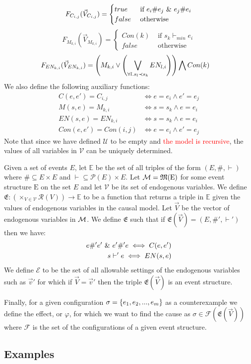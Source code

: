$$
    F_{C_{i,j}}(\vec V_{C_{i,j}}) = \begin{cases}
        true  & \text{ if } e_i \# e_j \ \& \  e_j \# e_i \\
        false & \text{ otherwise }
    \end{cases}
$$
$$
    F_{M_{k,i}}(\vec V_{M_{k,i}}) = \begin{cases}
        Con(k) & \text{ if } s_k \vdash_{min} e_i \\
        false  & \text{ otherwise }
    \end{cases}
$$
\begin{align*}
    F_{EN_{k,i}}(\vec V_{EN_{k,i}}) & =
    \left(
    M_{k,i} \vee
    \left(
    \bigvee_{\forall l. s_l  \prec s_k}EN_{l,i}
    \right)
    \right)
    \bigwedge
    Con(k)
\end{align*}
We also define the following auxiliary functions:
\begin{align*}
    C(e,e') = C_{i,j}    & \iff e = e_i \wedge e' = e_j \\
    M(s,e)  = M_{k,i}    & \iff s = s_k \wedge e = e_i  \\
    EN(s,e)  = EN_{k,i}  & \iff s = s_k \wedge e = e_i  \\
    Con(e,e') = Con(i,j) & \iff e = e_i \wedge e' = e_j
\end{align*}
Note that since we have defined $\mathcal{U}$ to be empty and
\textcolor{red}{the model is recursive}, the values of all variables in
$\mathcal{V}$ can be uniquely determined.

Given a set of events $E$, let $\mathbb{E}$ be the set of all
triples of the form $(E,\#,\vdash)$ where $\# \subseteq E \times E$ 
and $\vdash \subseteq \mathcal{P}(E) \times E$.
Let $\mathcal{M} = \mathfrak{M}(\mathrm{E})$ for some event structure
$\mathrm{E}$ on the set $E$ and let $\mathcal{V}$ be its set of
endogenous variables.
We define $\mathfrak{E}: (\times_{V \in \mathcal{V}}\mathcal{R}(V)) \rightarrow \mathbb{E}$
to be a function that returns a triple in $\mathbb{E}$ given the
values of endogenous variables in the causal model.
Let $\vec V$ be the vector of endogenous variables in $\mathcal{M}$.
We define $\mathfrak{E}$ such that if
$\mathfrak{E}(\vec V) = (E,\#',\vdash')$ then we have:
\begin{align*}
    e \#' e' \ \& \  e' \#' e \iff C(e,e') \\
    s \vdash' e \iff EN(s,e)
\end{align*}
We define $\mathcal{E}$ to be the set of all allowable
settings of the endogenous variables such as $\vec v'$ 
for which if $\vec V = \vec v'$ then the triple 
$\mathfrak{E}(\vec V)$ is an event structure.

Finally, for a given configuration $\sigma = \{e_1,e_2,...,e_m\}$ 
as a counterexample we define the effect, or $\varphi$, for which 
we want to find the cause as 
$\sigma \in \mathcal{F}(\mathfrak{E}(\vec V))$ where $\mathcal{F}$ 
is the set of the configurations of a given event structure.
\pagebreak
\subsection{Examples}
